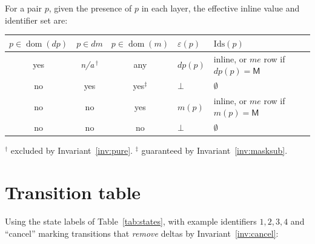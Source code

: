 \documentclass[11pt,a4paper]{article}
\theoremstyle{plain}
\theoremstyle{definition}
\theoremstyle{remark}
\newcommand{\M}{\mathsf{M}}
\newcommand{\dom}{\operatorname{dom}}
\begin{document}
For a pair $p$, given the presence of $p$ in each layer, the effective
inline value and identifier set are:

\begin{center}
\small
\begin{tabular}{@{}cccll@{}}
\toprule
$p \in \dom(dp)$ & $p \in dm$ & $p \in \dom(m)$ & $\varepsilon(p)$ & $\mathrm{Ids}(p)$ \\
\midrule
yes & \emph{n/a}\,$^{\dagger}$ & any & $dp(p)$        & inline, or $me$ row if $dp(p)=\M$ \\
no  & yes & yes$^{\ddagger}$   & $\bot$         & $\emptyset$ \\
no  & no  & yes                & $m(p)$         & inline, or $me$ row if $m(p)=\M$ \\
no  & no  & no                 & $\bot$         & $\emptyset$ \\
\bottomrule
\end{tabular}
\end{center}

\noindent
$^{\dagger}$ excluded by Invariant~\ref{inv:pure}.\quad
$^{\ddagger}$ guaranteed by Invariant~\ref{inv:masksub}.

\section{Transition table}
\label{app:transitions}

Using the state labels of Table~\ref{tab:states}, with example identifiers
$1,2,3,4$ and ``cancel'' marking transitions that \emph{remove} deltas by
Invariant~\ref{inv:cancel}:
\end{document}
